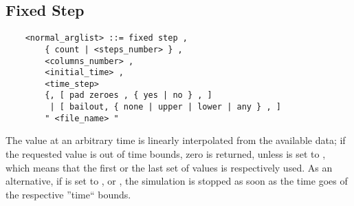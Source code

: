 \subsection{Fixed Step}
\begin{verbatim}
    <normal_arglist> ::= fixed step , 
        { count | <steps_number> } ,
        <columns_number> ,
        <initial_time> ,
        <time_step> 
        {, [ pad zeroes , { yes | no } , ]
         | [ bailout, { none | upper | lower | any } , ]
        " <file_name> "
\end{verbatim}
The value at an arbitrary time is linearly interpolated from the available
data; if the requested value is out of time bounds, zero is returned,
unless  is set to , which means that the first
or the last set of values is respectively used. As an alternative,
if  is set to ,  or ,
the simulation is stopped as soon as the time goes of the
respective ''time`` bounds.


